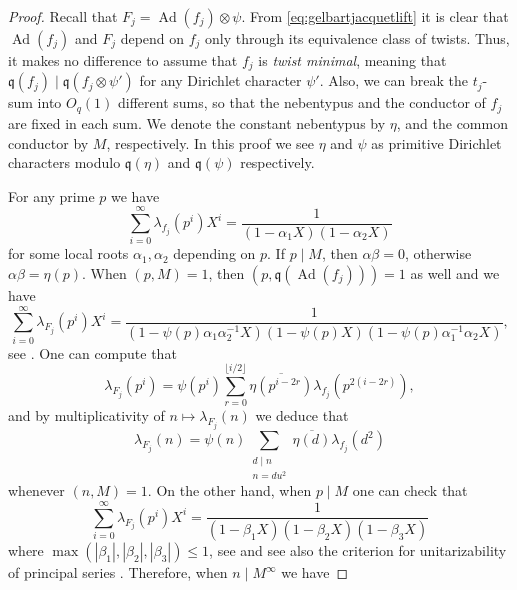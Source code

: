 \documentclass{article}
\theoremstyle{named}
\newcommand{\q}{\mathfrak{q}}
\DeclareMathOperator{\Ad}{Ad}
\begin{document}
\begin{proof}
Recall that $F_j = \Ad(f_j) \otimes \psi$. From \eqref{eq:gelbartjacquetlift} it is clear that $\Ad(f_j)$ and $F_j$ depend on $f_j$ only through its equivalence class of twists. Thus, it makes no difference to assume that $f_j$ is \emph{twist minimal}, meaning that $\q(f_j) \mid \q(f_j \otimes \psi')$ for any Dirichlet character $\psi'$. Also, we can break the $t_j$-sum into $O_q(1)$ different sums, so that the nebentypus and the conductor of $f_j$ are fixed in each sum. We denote the constant nebentypus by $\eta$, and the common conductor by $M$, respectively. In this proof we see $\eta$ and $\psi$ as primitive Dirichlet characters modulo $\q(\eta)$ and $\q(\psi)$ respectively.

For any prime $p$ we have  
\begin{equation*}
    \sum_{i = 0}^\infty \lambda_{f_j}(p^i) X^i  = \frac{1}{(1 - \alpha_1 X)(1 - \alpha_2 X)}
\end{equation*}
for some local roots $\alpha_1, \alpha_2$ depending on $p$. If $p \mid M$, then $\alpha \beta = 0$, otherwise $\alpha \beta = \eta(p)$. When $(p, M) = 1$, then $(p, \q(\Ad(f_j))) = 1$ as well and we have 
\begin{equation*}
    \sum_{i = 0}^\infty \lambda_{F_j}(p^i) X^i = \frac{1}{(1 - \psi(p)\alpha_1 \alpha_2^{-1} X)(1 - \psi(p)X)(1 - \psi(p)\alpha_1^{-1}\alpha_2 X)},
\end{equation*} 
see \cite[Proposition 1.4]{gelbartjacquetlift}. One can compute that
\begin{equation*}
    \lambda_{F_j}(p^i) = \psi(p^i)\sum_{r = 0}^{\lfloor i/2\rfloor} \overline{\eta(p^{i - 2r})}\lambda_{f_j}(p^{2(i-2r)}),
\end{equation*}
and by multiplicativity of $n \mapsto \lambda_{F_j}(n)$ we deduce that
\begin{equation}\label{eq:relationadjointLfunction}
     \lambda_{F_j}(n) = \psi(n)\sum_{\substack{d\mid n\\n = du^2}} \overline{\eta(d)}\lambda_{f_j}(d^2)
\end{equation}
whenever $(n, M) = 1$. On the other hand, when $p \mid M$ one can check that 
\begin{equation}
    \sum_{i = 0}^\infty \lambda_{F_j}(p^i) X^i = \frac{1}{(1 - \beta_1 X)(1 - \beta_2 X)(1 - \beta_3 X)}
\end{equation}
where $\max(|\beta_1|, |\beta_2|, |\beta_3|) \leq 1$, see \cite[Corollary 1.3 and Proposition 1.4]{gelbartjacquetlift} and see also the criterion for unitarizability of principal series \cite[Proposition 4.6.12]{bump}. Therefore, when $n \mid M^\infty$ we have 

\end{proof}
\end{document}
